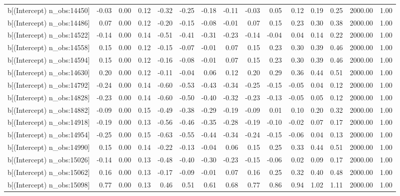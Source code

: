 \begin{table}[ht]
\begin{tabular}{rrrrrrrrrrrrrrr}
  b[(Intercept) n\_obs:14450] & -0.03 & 0.00 & 0.12 & -0.32 & -0.25 & -0.18 & -0.11 & -0.03 & 0.05 & 0.12 & 0.19 & 0.25 & 2000.00 & 1.00 \\ 
  b[(Intercept) n\_obs:14486] & 0.07 & 0.00 & 0.12 & -0.20 & -0.15 & -0.08 & -0.01 & 0.07 & 0.15 & 0.23 & 0.30 & 0.38 & 2000.00 & 1.00 \\ 
  b[(Intercept) n\_obs:14522] & -0.14 & 0.00 & 0.14 & -0.51 & -0.41 & -0.31 & -0.23 & -0.14 & -0.04 & 0.04 & 0.14 & 0.22 & 2000.00 & 1.00 \\ 
  b[(Intercept) n\_obs:14558] & 0.15 & 0.00 & 0.12 & -0.15 & -0.07 & -0.01 & 0.07 & 0.15 & 0.23 & 0.30 & 0.39 & 0.46 & 2000.00 & 1.00 \\ 
  b[(Intercept) n\_obs:14594] & 0.15 & 0.00 & 0.12 & -0.16 & -0.08 & -0.01 & 0.07 & 0.15 & 0.23 & 0.30 & 0.39 & 0.46 & 2000.00 & 1.00 \\ 
  b[(Intercept) n\_obs:14630] & 0.20 & 0.00 & 0.12 & -0.11 & -0.04 & 0.06 & 0.12 & 0.20 & 0.29 & 0.36 & 0.44 & 0.51 & 2000.00 & 1.00 \\ 
  b[(Intercept) n\_obs:14792] & -0.24 & 0.00 & 0.14 & -0.60 & -0.53 & -0.43 & -0.34 & -0.25 & -0.15 & -0.05 & 0.04 & 0.12 & 2000.00 & 1.00 \\ 
  b[(Intercept) n\_obs:14828] & -0.23 & 0.00 & 0.14 & -0.60 & -0.50 & -0.40 & -0.32 & -0.23 & -0.13 & -0.05 & 0.05 & 0.12 & 2000.00 & 1.00 \\ 
  b[(Intercept) n\_obs:14882] & -0.09 & 0.00 & 0.15 & -0.49 & -0.38 & -0.29 & -0.19 & -0.09 & 0.01 & 0.10 & 0.20 & 0.32 & 2000.00 & 1.00 \\ 
  b[(Intercept) n\_obs:14918] & -0.19 & 0.00 & 0.13 & -0.56 & -0.46 & -0.35 & -0.28 & -0.19 & -0.10 & -0.02 & 0.07 & 0.17 & 2000.00 & 1.00 \\ 
  b[(Intercept) n\_obs:14954] & -0.25 & 0.00 & 0.15 & -0.63 & -0.55 & -0.44 & -0.34 & -0.24 & -0.15 & -0.06 & 0.04 & 0.13 & 2000.00 & 1.00 \\ 
  b[(Intercept) n\_obs:14990] & 0.15 & 0.00 & 0.14 & -0.22 & -0.13 & -0.04 & 0.06 & 0.15 & 0.25 & 0.33 & 0.44 & 0.51 & 2000.00 & 1.00 \\ 
  b[(Intercept) n\_obs:15026] & -0.14 & 0.00 & 0.13 & -0.48 & -0.40 & -0.30 & -0.23 & -0.15 & -0.06 & 0.02 & 0.09 & 0.17 & 2000.00 & 1.00 \\ 
  b[(Intercept) n\_obs:15062] & 0.16 & 0.00 & 0.13 & -0.17 & -0.09 & -0.01 & 0.07 & 0.16 & 0.25 & 0.32 & 0.40 & 0.48 & 2000.00 & 1.00 \\ 
  b[(Intercept) n\_obs:15098] & 0.77 & 0.00 & 0.13 & 0.46 & 0.51 & 0.61 & 0.68 & 0.77 & 0.86 & 0.94 & 1.02 & 1.11 & 2000.00 & 1.00 \\ 

\end{tabular}
\end{table}
